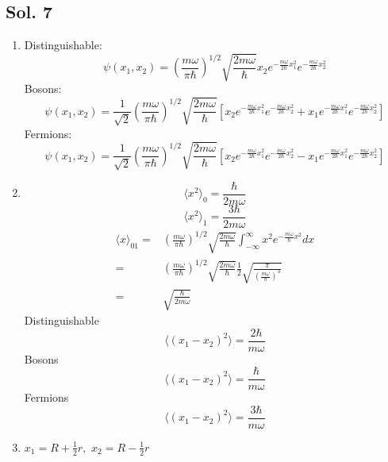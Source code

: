    \subsection*{Sol. 7}
   \begin{enumerate}
       \item 
       Distinguishable:
        $$
        \psi(x_1,x_2)=
        \left(
        \frac{m\omega}{\pi\hbar}
        \right)^{1/2}
        \sqrt{\frac{2m\omega}{\hbar}}
        x_2
        e^{-\frac{m\omega}{2\hbar}x_1^2}
        e^{-\frac{m\omega}{2\hbar}x_2^2}
        $$
    Bosons:
    $$
        \psi(x_1,x_2)=
        \frac{1}{\sqrt{2}}
        \left(
        \frac{m\omega}{\pi\hbar}
        \right)^{1/2}
        \sqrt{\frac{2m\omega}{\hbar}}
        \left[
        x_2
        e^{-\frac{m\omega}{2\hbar}x_1^2}
        e^{-\frac{m\omega}{2\hbar}x_2^2}
        +
        x_1
        e^{-\frac{m\omega}{2\hbar}x_1^2}
        e^{-\frac{m\omega}{2\hbar}x_2^2}
        \right]
        $$
    Fermions:
    $$
        \psi(x_1,x_2)=
        \frac{1}{\sqrt{2}}
        \left(
        \frac{m\omega}{\pi\hbar}
        \right)^{1/2}
        \sqrt{\frac{2m\omega}{\hbar}}
        \left[
        x_2
        e^{-\frac{m\omega}{2\hbar}x_1^2}
        e^{-\frac{m\omega}{2\hbar}x_2^2}
        -
        x_1
        e^{-\frac{m\omega}{2\hbar}x_1^2}
        e^{-\frac{m\omega}{2\hbar}x_2^2}
        \right]
        $$
        \item 
        $$
        \langle x^2\rangle_0 = \frac{\hbar}{2m\omega}
        $$
        $$
        \langle x^2\rangle_1 = \frac{3\hbar}{2m\omega}
        $$
        \begin{align*}
            \langle x\rangle_{01}=
            &\left(
        \frac{m\omega}{\pi\hbar}
        \right)^{1/2}
        \sqrt{\frac{2m\omega}{\hbar}}
            \int_{-\infty}^\infty
            x^2
        e^{-\frac{m\omega}{\hbar}x^2}
        dx
        \\
        =&
        \left(
        \frac{m\omega}{\pi\hbar}
        \right)^{1/2}
        \sqrt{\frac{2m\omega}{\hbar}}
        \frac{1}{2}
        \sqrt{\frac{\pi}{(\frac{m\omega}{\hbar})^3}}\\
        =&\sqrt{\frac{\hbar}{2m\omega}}
        \end{align*}
        Distinguishable 
        $$
        \langle(x_1-x_2)^2\rangle
        =\frac{2\hbar}{m\omega}
        $$
        Bosons 
        $$
        \langle(x_1-x_2)^2\rangle
        =\frac{\hbar}{m\omega}
        $$
        Fermions 
        $$
        \langle(x_1-x_2)^2\rangle
        =\frac{3\hbar}{m\omega}
        $$
        \item 
        $x_1=R+\frac{1}{2}r,$ $x_2=R-\frac{1}{2}r$
        

\end{enumerate}

